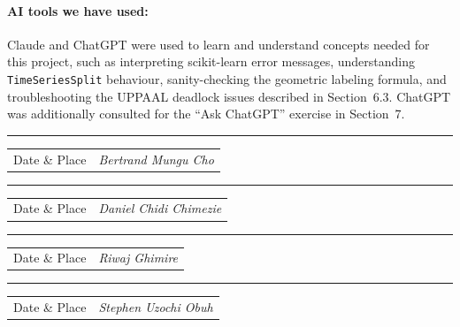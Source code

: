 \documentclass[english]{lni}
\begin{document}
\paragraph{AI tools we have used:} Claude and ChatGPT were used to learn and understand concepts needed for this project, such as interpreting scikit-learn error messages, understanding \texttt{TimeSeriesSplit} behaviour, sanity-checking the geometric labeling formula, and troubleshooting the UPPAAL deadlock issues described in Section~6.3. ChatGPT was additionally consulted for the ``Ask ChatGPT'' exercise in Section~7.

\vspace*{3\baselineskip}

\noindent
\begin{minipage}[t]{0.48\textwidth}
\vspace*{4\baselineskip}
\hrule
\begin{tabular}{@{}p{1.8cm}p{3.4cm}@{}}
\small Date \& Place & \small\raggedleft\textit{Bertrand Mungu Cho}
\end{tabular}
\end{minipage}
\hfill
\begin{minipage}[t]{0.48\textwidth}
\vspace*{4\baselineskip}
\hrule
\begin{tabular}{@{}p{1.8cm}p{3.4cm}@{}}
\small Date \& Place & \small\raggedleft\textit{Daniel Chidi Chimezie}
\end{tabular}
\end{minipage}

\vspace*{3\baselineskip}

\noindent
\begin{minipage}[t]{0.48\textwidth}
\vspace*{4\baselineskip}
\hrule
\begin{tabular}{@{}p{1.8cm}p{3.4cm}@{}}
\small Date \& Place & \small\raggedleft\textit{Riwaj Ghimire}
\end{tabular}
\end{minipage}
\hfill
\begin{minipage}[t]{0.48\textwidth}
\vspace*{4\baselineskip}
\hrule
\begin{tabular}{@{}p{1.8cm}p{3.4cm}@{}}
\small Date \& Place & \small\raggedleft\textit{Stephen Uzochi Obuh}
\end{tabular}
\end{minipage}

\newpage

\end{document}
